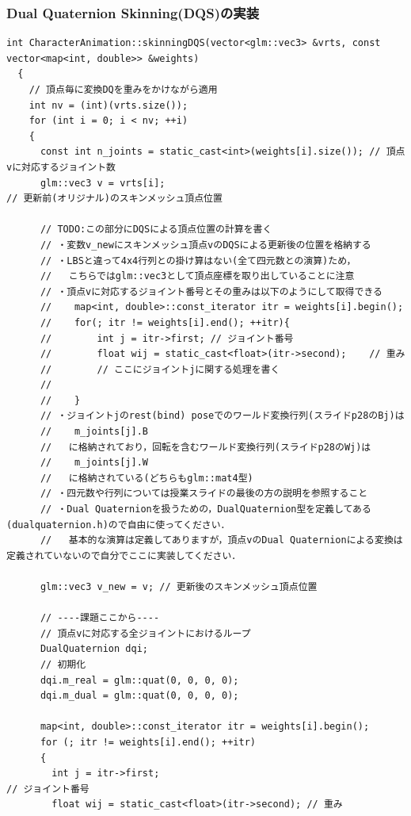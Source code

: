 \documentclass[a4paper,10pt,uplatex,dvipdfmx]{jsarticle}
\begin{document}
\subsubsection{Dual Quaternion Skinning(DQS)の実装}
\begin{lstlisting}[caption=characteranimation.cppのskinningDQS関数]
  int CharacterAnimation::skinningDQS(vector<glm::vec3> &vrts, const vector<map<int, double>> &weights)
  {
    // 頂点毎に変換DQを重みをかけながら適用
    int nv = (int)(vrts.size());
    for (int i = 0; i < nv; ++i)
    {
      const int n_joints = static_cast<int>(weights[i].size()); // 頂点vに対応するジョイント数
      glm::vec3 v = vrts[i];																		// 更新前(オリジナル)のスキンメッシュ頂点位置
  
      // TODO:この部分にDQSによる頂点位置の計算を書く
      // ・変数v_newにスキンメッシュ頂点vのDQSによる更新後の位置を格納する
      // ・LBSと違って4x4行列との掛け算はない(全て四元数との演算)ため，
      //   こちらではglm::vec3として頂点座標を取り出していることに注意
      // ・頂点vに対応するジョイント番号とその重みは以下のようにして取得できる
      //	map<int, double>::const_iterator itr = weights[i].begin();
      //	for(; itr != weights[i].end(); ++itr){
      //		int j = itr->first;	// ジョイント番号
      //		float wij = static_cast<float>(itr->second);	// 重み
      //		// ここにジョイントjに関する処理を書く
      //
      //	}
      // ・ジョイントjのrest(bind) poseでのワールド変換行列(スライドp28のBj)は
      //    m_joints[j].B
      //   に格納されており，回転を含むワールド変換行列(スライドp28のWj)は
      //    m_joints[j].W
      //   に格納されている(どちらもglm::mat4型)
      // ・四元数や行列については授業スライドの最後の方の説明を参照すること
      // ・Dual Quaternionを扱うための，DualQuaternion型を定義してある(dualquaternion.h)ので自由に使ってください．
      //   基本的な演算は定義してありますが，頂点vのDual Quaternionによる変換は定義されていないので自分でここに実装してください．
  
      glm::vec3 v_new = v; // 更新後のスキンメッシュ頂点位置
  
      // ----課題ここから----
      // 頂点vに対応する全ジョイントにおけるループ
      DualQuaternion dqi;
      // 初期化
      dqi.m_real = glm::quat(0, 0, 0, 0);
      dqi.m_dual = glm::quat(0, 0, 0, 0);
  
      map<int, double>::const_iterator itr = weights[i].begin();
      for (; itr != weights[i].end(); ++itr)
      {
        int j = itr->first;													 // ジョイント番号
        float wij = static_cast<float>(itr->second); // 重み
  

\end{lstlisting}
\end{document}
